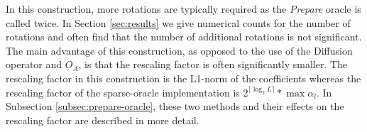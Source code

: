 In this construction, more rotations are typically required as the \textit{Prepare} oracle is called twice.
In Section \ref{sec:results} we give numerical counts for the number of rotations and often find that the number of additional rotations is not significant.
The main advantage of this construction, as opposed to the use of the Diffusion operator and $O_A$, is that the rescaling factor is often significantly smaller.
The rescaling factor in this construction is the L1-norm of the coefficients whereas the rescaling factor of the sparse-oracle implementation is $2^{\lceil \log_2{L} \rceil} * \max{\alpha_l}$.
In Subsection \ref{subsec:prepare-oracle}, these two methods and their effects on the rescaling factor are described in more detail.

